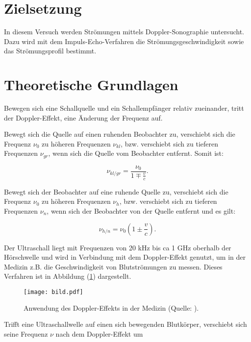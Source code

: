 \section{Zielsetzung}
In diesem Versuch werden Strömungen mittels Doppler-Sonographie untersucht.
Dazu wird mit dem Impuls-Echo-Verfahren die Strömungsgeschwindigkeit sowie das Strömungsprofil bestimmt.

\section{Theoretische Grundlagen}
Bewegen sich eine Schallquelle und ein Schallempfänger relativ zueinander, tritt der Doppler-Effekt, 
eine Änderung der Frequenz auf.

\noindent
Bewegt sich die Quelle auf einen ruhenden Beobachter zu, verschiebt sich die Frequenz $\nu_0$ zu höheren Frequenzen $\nu_{kl}$, 
bzw. verschiebt sich zu tieferen Frequenzen $\nu_{gr}$, wenn sich die Quelle vom Beobachter entfernt.
Somit ist:

\begin{equation}
\nu_{kl/gr} = \frac{\nu_0}{1 \mp \frac{v}{c}}.
\label{eqn:doppler1}
\end{equation}


\noindent
Bewegt sich der Beobachter auf eine ruhende Quelle zu, verschiebt sich die Frequenz $\nu_0$ zu höheren Frequenzen $\nu_h$, 
bzw. verschiebt sich zu tieferen Frequenzen $\nu_{n}$, wenn sich der Beobachter von der Quelle entfernt und es gilt:

\begin{equation}
        \nu_{h/n} = \nu_0 (1 \pm \frac{v}{c}).
        \label{eqn:doppler2}
\end{equation}


\noindent
Der Ultraschall liegt mit Frequenzen von 20 kHz bis ca 1 GHz oberhalb der Hörschwelle und wird in Verbindung mit dem Doppler-Effekt genutzt,
um in der Medizin z.B. die Geschwindigkeit von Blutströmungen zu messen.
Dieses Verfahren ist in Abbildung (\ref{fig:bild}) dargestellt.

\begin{figure}
    \centering
       \texttt{[image: bild.pdf]}
       \caption{Anwendung des Doppler-Effekts in der Medizin (Quelle: \cite{US3}).}
       \label{fig:bild}
\end{figure}

\noindent
Trifft eine Ultraschallwelle auf einen sich bewegenden Blutkörper, 
verschiebt sich seine Frequenz $\nu$ nach dem Doppler-Effekt um 

